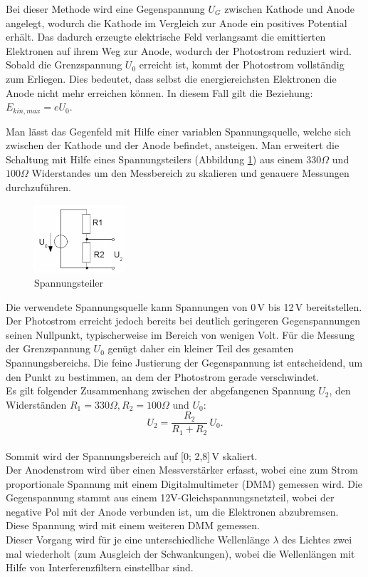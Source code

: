 Bei dieser Methode wird eine Gegenspannung $U_G$ zwischen Kathode und Anode angelegt, wodurch die Kathode im Vergleich zur Anode ein positives Potential erhält.
Das dadurch erzeugte elektrische Feld verlangsamt die emittierten Elektronen auf ihrem Weg zur Anode, wodurch der Photostrom reduziert wird. Sobald die Grenzspannung $U_0$ erreicht ist, kommt der Photostrom vollständig zum Erliegen. 
Dies bedeutet, dass selbst die energiereichsten Elektronen die Anode nicht mehr erreichen können. In diesem Fall gilt die Beziehung: 
$E_{kin,max} = eU_0$.

Man lässt das Gegenfeld mit Hilfe einer variablen Spannungsquelle, welche sich zwischen der Kathode und der Anode befindet, ansteigen.
Man erweitert die Schaltung mit Hilfe eines Spannungsteilers (Abbildung \ref{fig:spannungsteiler}) aus einem $330\Omega$ und $100\Omega$ Widerstandes um den Messbereich zu skalieren und genauere Messungen durchzuführen.
\begin{figure}[htbp]
    \centering
    \includegraphics[width=0.3\textwidth]{figs/Spannungsteiler.png}
    \caption{ Spannungsteiler \cite{Spannungsteiler}}
    \label{fig:spannungsteiler}
\end{figure}
\FloatBarrier
Die verwendete Spannungsquelle kann Spannungen von 0\,V bis 12\,V bereitstellen. 
Der Photostrom erreicht jedoch bereits bei deutlich geringeren Gegenspannungen seinen Nullpunkt, typischerweise im Bereich von wenigen Volt. 
Für die Messung der Grenzspannung $U_0$ genügt daher ein kleiner Teil des gesamten Spannungsbereichs. 
Die feine Justierung der Gegenspannung ist entscheidend, um den Punkt zu bestimmen, an dem der Photostrom gerade verschwindet.\\
Es gilt folgender Zusammenhang zwischen der abgefangenen Spannung $U_2$, den Widerständen $R_1 = 330 \Omega, R_2 = 100 \Omega$ und $U_0$:
\begin{equation}
  U_2 = \frac{R_2}{R_1 + R_2}\,U_0.
\end{equation}\\
Sommit wird der Spannungsbereich auf [0; 2{,}8]\,V skaliert.\\

Der Anodenstrom wird über einen Messverstärker erfasst, 
wobei eine zum Strom proportionale Spannung mit einem 
Digitalmultimeter (DMM) gemessen wird. Die Gegenspannung 
stammt aus einem 12V-Gleichspannungsnetzteil, 
wobei der negative Pol mit der Anode verbunden ist, 
um die Elektronen abzubremsen. Diese Spannung wird 
mit einem weiteren DMM gemessen.\\
Dieser Vorgang wird für je eine unterschiedliche Wellenlänge
$\lambda$ des Lichtes zwei mal wiederholt (zum Ausgleich der Schwankungen), wobei die
Wellenlängen mit Hilfe von Interferenzfiltern
einstellbar sind.

